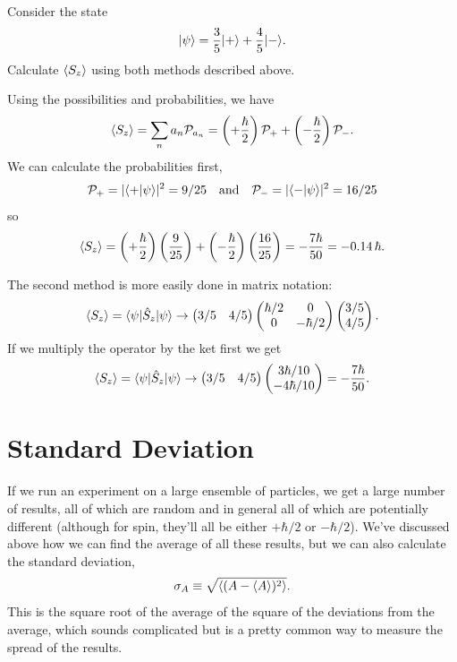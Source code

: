 \begin{example}
\label{ex_exp_val}

Consider the state
\[
| \psi \rangle = \frac{3}{5} | + \rangle + \frac{4}{5} | - \rangle.
\]
Calculate $\langle S_z \rangle$ using both methods described above.

Using the possibilities and probabilities, we have
\[
\langle S_z \rangle = \sum_n a_n \mathcal{P}_{a_n} = \left(+\frac{\hbar}{2} \right) \mathcal{P_+} + \left(-\frac{\hbar}{2} \right) \mathcal{P_-}.
\]
We can calculate the probabilities first,
\[
\mathcal{P_+} = |\langle + | \psi \rangle|^2 = 9/25 \quad \text{and} \quad \mathcal{P}_- = |\langle - | \psi \rangle|^2 = 16/25
\]
so
\[
\langle S_z \rangle = \left(+\frac{\hbar}{2} \right) \left(\frac{9}{25} \right) + \left(-\frac{\hbar}{2} \right) \left(\frac{16}{25} \right) = -\frac{7\hbar}{50} = -0.14 \, \hbar.
\]

The second method is more easily done in matrix notation:
\[
\langle S_z \rangle = \langle \psi | \hat{S}_z | \psi \rangle \to
\begin{pmatrix} 3/5 & 4/5 \end{pmatrix} 
\begin{pmatrix} \hbar/2 & 0 \\ 0 & -\hbar/2 \end{pmatrix}
\begin{pmatrix} 3/5 \\ 4/5 \end{pmatrix}.
\]
If we multiply the operator by the ket first we get
\[
\langle S_z \rangle = \langle \psi | \hat{S}_z | \psi \rangle \to
\begin{pmatrix} 3/5 & 4/5 \end{pmatrix} 
\begin{pmatrix} 3\hbar/10  \\ -4\hbar/10 \end{pmatrix} = -\frac{7\hbar}{50}.
\]
\end{example}


\section{Standard Deviation}

If we run an experiment on a large ensemble of particles, we get a large number of results, all of which are random and in general all of which are potentially different (although for spin, they'll all be either $+\hbar/2$ or $-\hbar/2$).  We've discussed above how we can find the average of all these results, but we can also calculate the standard deviation,
\begin{equation}
\sigma_A \equiv \sqrt{\langle (A - \langle A \rangle)^2  \rangle }.
\end{equation}
This is the square root of the average of the square of the deviations from the average, which sounds complicated but is a pretty common way to measure the spread of the results.

